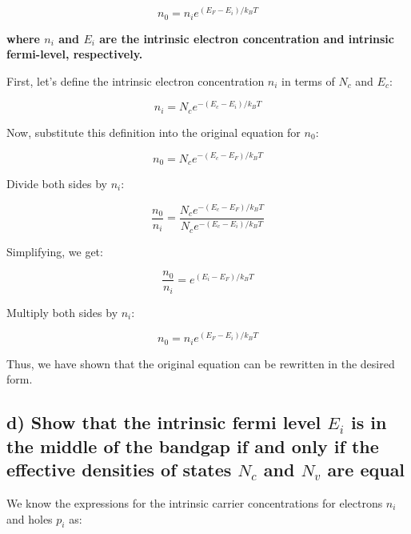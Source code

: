 \begin{equation*}
    n_{0}=n_{i} e^{\left(E_{F}-E_{i}\right) / k_{B} T} 
\end{equation*}

\textbf{where $n_i$ and $E_i$ are the intrinsic electron concentration and intrinsic fermi-level, respectively.}

First, let's define the intrinsic electron concentration $ n_i $ in terms of $ N_c $ and $ E_c $:

\begin{equation*}
n_{i} = N_{c} e^{-\left(E_{c} - E_{i}\right) / k_{B} T}
\end{equation*}

Now, substitute this definition into the original equation for $ n_0 $:

\begin{equation*}
n_{0} = N_{c} e^{-\left(E_{c} - E_{F}\right) / k_{B} T}
\end{equation*}

Divide both sides by $ n_i $:

\begin{equation*}
\frac{n_{0}}{n_{i}} = \frac{N_{c} e^{-\left(E_{c} - E_{F}\right) / k_{B} T}}{N_{c} e^{-\left(E_{c} - E_{i}\right) / k_{B} T}}
\end{equation*}

Simplifying, we get:

\begin{equation*}
\frac{n_{0}}{n_{i}} = e^{\left(E_{i} - E_{F}\right) / k_{B} T}
\end{equation*}

Multiply both sides by $ n_i $:

\begin{equation*}
n_{0} = n_{i} e^{\left(E_{F} - E_{i}\right) / k_{B} T}
\end{equation*}

Thus, we have shown that the original equation can be rewritten in the desired form.


\subsection*{d) Show that the intrinsic fermi level $E_i$ is in the middle of the bandgap if and only if the effective densities of states $N_c$ and $N_v$ are equal}

We know the expressions for the intrinsic carrier concentrations for electrons \( n_i \) and holes \( p_i \) as:

